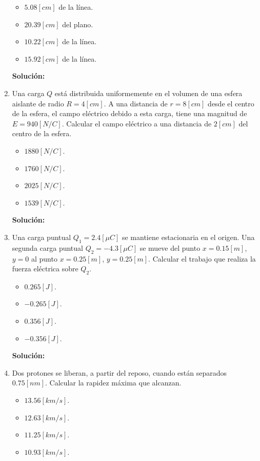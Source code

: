 \documentclass[letter,11pt]{article}
\begin{document}
\begin{enumerate}
\begin{itemize}
    \item $ 5.08 [cm]$ de la línea.
    \item $20.39 [cm]$ del plano.
    \item $10.22 [cm]$ de la línea.
    \item $15.92 [cm]$ de la línea.
\end{itemize}

\textbf{Solución:}

\item Una carga $Q$ está distribuida uniformemente en el volumen de una esfera
aislante de radio $R = 4 [cm]$. A una distancia de $r = 8 [cm]$ desde el centro
de la esfera, el campo eléctrico debido a esta carga, tiene una magnitud de
$E = 940 [N/C]$. Calcular el campo eléctrico a una distancia de $2 [cm]$ del
centro de la esfera.

\begin{itemize}
    \item $1880 [N/C]$.
    \item $1760 [N/C]$.
    \item $2025 [N/C]$.
    \item $1539 [N/C]$.
\end{itemize}

\textbf{Solución:}

\item Una carga puntual $Q_1 = 2.4 [\mu C]$ se mantiene estacionaria en el
origen. Una segunda carga puntual $Q_2 = -4.3 [\mu C]$ se mueve del punto
$x = 0.15 [m]$, $y = 0$ al punto $x = 0.25 [m]$, $y = 0.25 [m]$. Calcular el
trabajo que realiza la fuerza eléctrica sobre $Q_2$.

\begin{itemize}
    \item $ 0.265 [J]$.
    \item $-0.265 [J]$.
    \item $ 0.356 [J]$.
    \item $-0.356 [J]$.
\end{itemize}

\textbf{Solución:}

\item Dos protones se liberan, a partir del reposo, cuando están separados
$0.75 [nm]$. Calcular la rapidez máxima que alcanzan.

\begin{itemize}
    \item $13.56 [km/s]$.
    \item $12.63 [km/s]$.
    \item $11.25 [km/s]$.
    \item $10.93 [km/s]$.
\end{itemize}


\end{enumerate}
\end{document}
